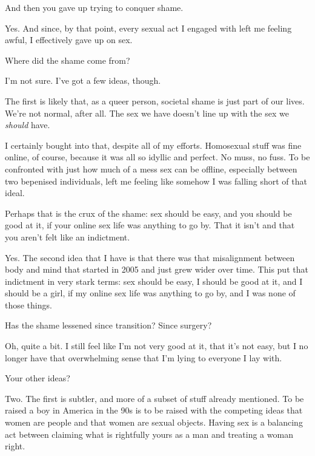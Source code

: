 \begin{paracol}{2}
\begin{leftcolumn}
\begin{ally}
And then you gave up trying to conquer shame.
\end{ally}
Yes. And since, by that point, every sexual act I engaged with left me feeling awful, I effectively gave up on sex.
\newpage

\begin{ally}
Where did the shame come from?
\end{ally}
I'm not sure. I've got a few ideas, though.

The first is likely that, as a queer person, societal shame is just part of our lives. We're not normal, after all. The sex we have doesn't line up with the sex we \emph{should} have.

I certainly bought into that, despite all of my efforts. Homosexual stuff was fine online, of course, because it was all so idyllic and perfect. No muss, no fuss. To be confronted with just how much of a mess sex can be offline, especially between two bepenised individuals, left me feeling like somehow I was falling short of that ideal.

\begin{ally}
Perhaps that is the crux of the shame: sex should be easy, and you should be good at it, if your online sex life was anything to go by. That it isn't and that you aren't felt like an indictment.
\end{ally}
Yes. The second idea that I have is that there was that misalignment between body and mind that started in 2005 and just grew wider over time. This put that indictment in very stark terms: sex should be easy, I should be good at it, and I should be a girl, if my online sex life was anything to go by, and I was none of those things.

\begin{ally}
Has the shame lessened since transition? Since surgery?
\end{ally}
Oh, quite a bit. I still feel like I'm not very good at it, that it's not easy, but I no longer have that overwhelming sense that I'm lying to everyone I lay with.

\begin{ally}
Your other ideas?
\end{ally}
Two. The first is subtler, and more of a subset of stuff already mentioned. To be raised a boy in America in the 90s is to be raised with the competing ideas that women are people and that women are sexual objects. Having sex is a balancing act between claiming what is rightfully yours as a man and treating a woman right.


\end{leftcolumn}
\end{paracol}
